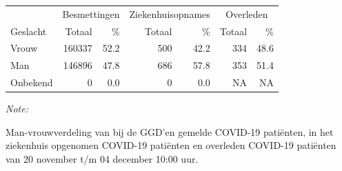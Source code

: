 \documentclass[
  english,
  man,floatsintext]{apa6}
\begin{document}
\newpage

\begin{table}
\centering\begingroup\fontsize{11}{13}\selectfont

\begin{threeparttable}
\begin{tabular}{lrrrrrr}
\toprule
\multicolumn{1}{c}{ } & \multicolumn{2}{c}{Besmettingen} & \multicolumn{2}{c}{Ziekenhuisopnames} & \multicolumn{2}{c}{Overleden} \\
\cmidrule(l{3pt}r{3pt}){2-3} \cmidrule(l{3pt}r{3pt}){4-5} \cmidrule(l{3pt}r{3pt}){6-7}
Geslacht & Totaal & \% & Totaal & \% & Totaal & \%\\
\midrule
Vrouw & 160337 & 52.2 & 500 & 42.2 & 334 & 48.6\\
Man & 146896 & 47.8 & 686 & 57.8 & 353 & 51.4\\
Onbekend & 0 & 0.0 & 0 & 0.0 & NA & NA\\
\bottomrule
\end{tabular}
\begin{tablenotes}
\item \textit{Note: } 
\item Man-vrouwverdeling van bij de GGD’en gemelde COVID-19 patiënten, in het ziekenhuis opgenomen COVID-19 patiënten en overleden COVID-19 patiënten van 20 november t/m 04 december 10:00 uur.
\end{tablenotes}
\end{threeparttable}
\endgroup{}
\end{table}
\newpage
\end{document}
